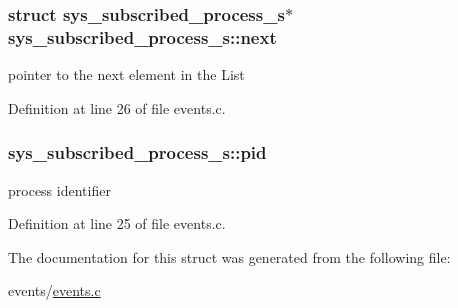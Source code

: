 \subsubsection[{next}]{\setlength{\rightskip}{0pt plus 5cm}struct {\bf sys\+\_\+subscribed\+\_\+process\+\_\+s}$\ast$ sys\+\_\+subscribed\+\_\+process\+\_\+s\+::next}\label{structsys__subscribed__process__s_abcf0ef070dc4fd0ba7165dfae52d7316}
pointer to the next element in the List 

Definition at line 26 of file events.\+c.

\hypertarget{structsys__subscribed__process__s_a94e62af7fee25e53ea6c81cbb311783d}{}
\subsubsection[{pid}]{ sys\+\_\+subscribed\+\_\+process\+\_\+s\+::pid}\label{structsys__subscribed__process__s_a94e62af7fee25e53ea6c81cbb311783d}
process identifier 

Definition at line 25 of file events.\+c.



The documentation for this struct was generated from the following file\+:\begin{DoxyCompactItemize}
\item 
events/\hyperlink{events_8c}{events.\+c}\end{DoxyCompactItemize}
